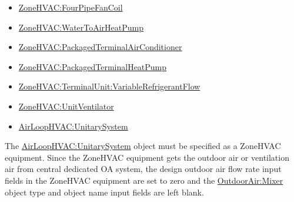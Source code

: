 \begin{itemize}
\setlength{\parskip}{0pt}
\setlength{\itemsep}{0pt plus 2pt}
\item \hyperref[zonehvacfourpipefancoil]{ZoneHVAC:FourPipeFanCoil}
\item \hyperref[zonehvacwatertoairheatpump]{ZoneHVAC:WaterToAirHeatPump}
\item \hyperref[zonehvacpackagedterminalairconditioner]{ZoneHVAC:PackagedTerminalAirConditioner}
\item \hyperref[zonehvacpackagedterminalheatpump]{ZoneHVAC:PackagedTerminalHeatPump}
\item \hyperref[zonehvacterminalunitvariablerefrigerantflow]{ZoneHVAC:TerminalUnit:VariableRefrigerantFlow}
\item \hyperref[zonehvacunitventilator]{ZoneHVAC:UnitVentilator}
\item \hyperref[airloophvacunitarysystem]{AirLoopHVAC:UnitarySystem}
\end{itemize}


The \hyperref[airloophvacunitarysystem]{AirLoopHVAC:UnitarySystem} object must be specified as a ZoneHVAC equipment. Since the ZoneHVAC equipment gets the outdoor air or ventilation air from central dedicated OA system, the design outdoor air flow rate input fields in the ZoneHVAC equipment are set to zero and the \hyperref[outdoorairmixer]{OutdoorAir:Mixer} object type and object name input fields are left blank.

